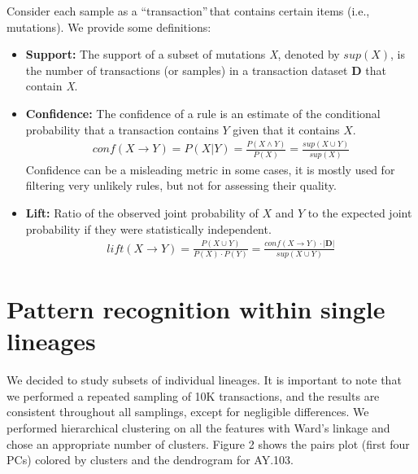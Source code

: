 \documentclass[a0,landscape]{a0poster}
\begin{document}
\begin{multicols}{4}
Consider each sample as a \textquotedblleft transaction\textquotedblright$\,$that contains certain items (i.e., mutations). We provide some definitions:
\begin{itemize}
	\item \textbf{Support:} The support of a subset of mutations \textit{X}, denoted by $sup(X)$, is the number of transactions (or samples) in a transaction dataset \textbf{D} that contain \textit{X}. 
	\item \textbf{Confidence:} The confidence of a rule is an estimate of the conditional probability that a transaction contains $Y$ given that it contains $X$.
	\begin{align*}
		conf(X \rightarrow Y) = P(X|Y) = \frac{P(X \land Y)}{P(X)} = \frac{sup(X \cup Y)}{sup(X)}
	\end{align*}
	Confidence can be a misleading metric in some cases, it is mostly used for filtering very unlikely rules, but not for assessing their quality.
	\item \textbf{Lift:} Ratio of the observed joint probability of $X$ and $Y$ to the expected joint probability if they were statistically independent.	
	\begin{align*}
		lift(X \rightarrow Y) = \frac{P(X\cup Y)}{P(X)\cdot P(Y)} = \frac{conf(X\rightarrow Y)\cdot |\mathbf{D}|}{sup(X\cup Y)}
	\end{align*}
\end{itemize}

\section*{Pattern recognition within single lineages}
We decided to study subsets of individual lineages. It is important to note that we performed a repeated sampling of 10K transactions, and the results are consistent throughout all samplings, except for negligible differences. We performed hierarchical clustering on all the features with Ward's linkage and chose an appropriate number of clusters. Figure 2 shows the pairs plot (first four PCs) colored by clusters and the dendrogram for AY.103. 


\end{multicols}
\end{document}
